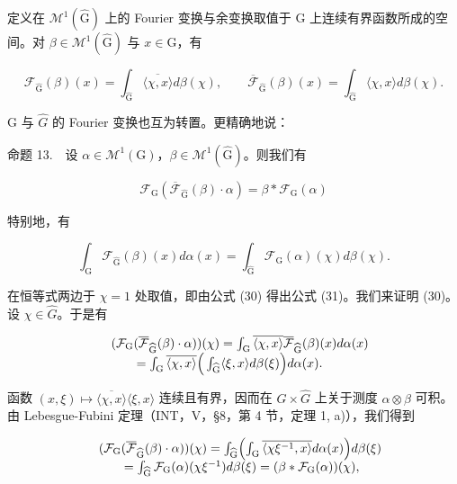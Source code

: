 定义在 \(\mathcal{M}^{1}(\widehat{\mathrm{G}})\) 上的 Fourier 变换与余变换取值于 G 上连续有界函数所成的空间。对 \(\beta\in\mathcal{M}^{1}(\widehat{\mathrm{G}})\) 与 \(x\in\mathrm{G}\)，有

\[
\mathcal {F} _ {\widehat {\mathrm{G}}} (\beta) (x) = \int_ {\widehat {\mathrm{G}}} \overline {{\langle \chi , x \rangle}} d \beta (\chi), \qquad \overline {{\mathcal {F}}} _ {\widehat {\mathrm{G}}} (\beta) (x) = \int_ {\widehat {\mathrm{G}}} \langle \chi , x \rangle d \beta (\chi).
\]

G 与 \(\widehat{G}\) 的 Fourier 变换也互为转置。更精确地说：

命题 13.　设 \(\alpha \in \mathcal{M}^{1}(\mathrm{G})\)，\(\beta \in \mathcal{M}^{1}(\widehat{\mathrm{G}})\)。则我们有

\[
\mathcal {F} _ {\mathrm{G}} (\overline {{\mathcal {F}}} _ {\widehat {\mathrm{G}}} (\beta) \cdot \alpha) = \beta * \mathcal {F} _ {\mathrm{G}} (\alpha)\tag{30}
\]

特别地，有

\[
\int_ {\mathrm{G}} \mathcal {F} _ {\widehat {\mathrm{G}}} (\beta) (x) d \alpha (x) = \int_ {\widehat {\mathrm{G}}} \mathcal {F} _ {\mathrm{G}} (\alpha) (\chi) d \beta (\chi).\tag{31}
\]

在恒等式两边于 \(\chi = 1\) 处取值，即由公式 (30) 得出公式 (31)。我们来证明 (30)。设 \(\chi \in \widehat{G}\)。于是有

\[
\begin{array}{r l} & {(\mathcal {F} _ {\mathrm{G}} (\overline {{\mathcal {F}}} _ {\widehat {\mathrm{G}}} (\beta) \cdot \alpha)) (\chi) = \int_ {\mathrm{G}} \overline {{\langle \chi , x \rangle}} \overline {{\mathcal {F}}} _ {\widehat {\mathrm{G}}} (\beta) (x) d \alpha (x)} \\ & {\qquad = \int_ {\mathrm{G}} \overline {{\langle \chi , x \rangle}} \Big (\int_ {\widehat {\mathrm{G}}} \langle \xi , x \rangle d \beta (\xi) \Big) d \alpha (x).} \end{array}
\]

函数 \((x,\xi)\mapsto\overline{\langle\chi,x\rangle}\langle\xi,x\rangle\) 连续且有界，因而在 \(G\times\widehat{G}\) 上关于测度 \(\alpha\otimes\beta\) 可积。由 Lebesgue-Fubini 定理（INT，V，§8，第 4 节，定理 1, a)），我们得到

\[
\begin{array}{r l} & {(\mathcal {F} _ {\mathrm{G}} (\overline {{\mathcal {F}}} _ {\widehat {\mathrm{G}}} (\beta) \cdot \alpha)) (\chi) = \int_ {\widehat {\mathrm{G}}} \Bigl (\int_ {\mathrm{G}} \overline {{\langle \chi \xi^ {- 1} , x \rangle}} d \alpha (x) \Bigr) d \beta (\xi)} \\ & {\qquad = \int_ {\widehat {\mathrm{G}}} \mathcal {F} _ {\mathrm{G}} (\alpha) (\chi \xi^ {- 1}) d \beta (\xi) = (\beta * \mathcal {F} _ {\mathrm{G}} (\alpha)) (\chi),} \end{array}
\]

